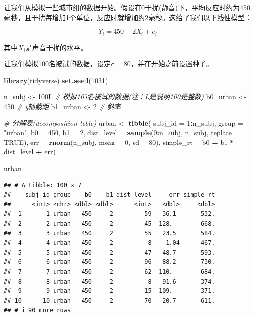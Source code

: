 \documentclass[
]{book}
\newenvironment{Shaded}{\begin{snugshade}}{\end{snugshade}}
\newcommand{\AttributeTok}[1]{\textcolor[rgb]{0.13,0.29,0.53}{#1}}
\newcommand{\CommentTok}[1]{\textcolor[rgb]{0.56,0.35,0.01}{\textit{#1}}}
\newcommand{\ConstantTok}[1]{\textcolor[rgb]{0.56,0.35,0.01}{#1}}
\newcommand{\DecValTok}[1]{\textcolor[rgb]{0.00,0.00,0.81}{#1}}
\newcommand{\FunctionTok}[1]{\textcolor[rgb]{0.13,0.29,0.53}{\textbf{#1}}}
\newcommand{\NormalTok}[1]{#1}
\newcommand{\OtherTok}[1]{\textcolor[rgb]{0.56,0.35,0.01}{#1}}
\newcommand{\SpecialCharTok}[1]{\textcolor[rgb]{0.81,0.36,0.00}{\textbf{#1}}}
\newcommand{\StringTok}[1]{\textcolor[rgb]{0.31,0.60,0.02}{#1}}
\begin{document}
让我们从模拟一些城市组的数据开始。假设在0干扰(静音)下，平均反应时约为450毫秒，且干扰每增加1个单位，反应时就增加约2毫秒。这给了我们以下线性模型：

\[Y_i = 450 + 2 X_i + e_i\]

其中\(X_i\)是声音干扰的水平。

让我们模拟100名被试的数据，设定\(\sigma = 80\)，并在开始之前设置种子。

\begin{Shaded}
\begin{Highlighting}[]
\FunctionTok{library}\NormalTok{(tidyverse)}
\FunctionTok{set.seed}\NormalTok{(}\DecValTok{1031}\NormalTok{)}

\NormalTok{n\_subj }\OtherTok{\textless{}{-}}\NormalTok{ 100L  }\CommentTok{\# 模拟100名被试的数据(注：L是说明100是整数)}
\NormalTok{b0\_urban }\OtherTok{\textless{}{-}} \DecValTok{450} \CommentTok{\# y轴截距}
\NormalTok{b1\_urban }\OtherTok{\textless{}{-}} \DecValTok{2}   \CommentTok{\# 斜率}

\CommentTok{\# 分解表(decomposition table)}
\NormalTok{urban }\OtherTok{\textless{}{-}} \FunctionTok{tibble}\NormalTok{(}
  \AttributeTok{subj\_id =} \DecValTok{1}\SpecialCharTok{:}\NormalTok{n\_subj,}
  \AttributeTok{group =} \StringTok{"urban"}\NormalTok{,}
  \AttributeTok{b0 =} \DecValTok{450}\NormalTok{,}
  \AttributeTok{b1 =} \DecValTok{2}\NormalTok{,}
  \AttributeTok{dist\_level =} \FunctionTok{sample}\NormalTok{(}\DecValTok{0}\SpecialCharTok{:}\NormalTok{n\_subj, n\_subj, }\AttributeTok{replace =} \ConstantTok{TRUE}\NormalTok{),}
  \AttributeTok{err =} \FunctionTok{rnorm}\NormalTok{(n\_subj, }\AttributeTok{mean =} \DecValTok{0}\NormalTok{, }\AttributeTok{sd =} \DecValTok{80}\NormalTok{),}
  \AttributeTok{simple\_rt =}\NormalTok{ b0 }\SpecialCharTok{+}\NormalTok{ b1 }\SpecialCharTok{*}\NormalTok{ dist\_level }\SpecialCharTok{+}\NormalTok{ err)}

\NormalTok{urban}
\end{Highlighting}
\end{Shaded}

\begin{verbatim}
## # A tibble: 100 x 7
##    subj_id group    b0    b1 dist_level     err simple_rt
##      <int> <chr> <dbl> <dbl>      <int>   <dbl>     <dbl>
##  1       1 urban   450     2         59  -36.1       532.
##  2       2 urban   450     2         45  128.        668.
##  3       3 urban   450     2         55   23.5       584.
##  4       4 urban   450     2          8    1.04      467.
##  5       5 urban   450     2         47   48.7       593.
##  6       6 urban   450     2         96   88.2       730.
##  7       7 urban   450     2         62  110.        684.
##  8       8 urban   450     2          8  -91.6       374.
##  9       9 urban   450     2         15 -109.        371.
## 10      10 urban   450     2         70   20.7       611.
## # i 90 more rows
\end{verbatim}
\end{document}
